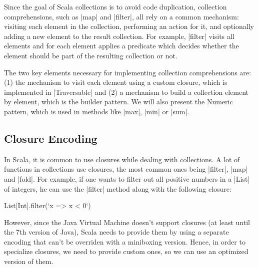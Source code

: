 
Since the goal of Scala collections is to avoid code duplication, collection comprehensions, such as |map| and |filter|, all rely on a common mechanism: visiting each element in the collection, performing an action for it, and optionally adding a new element to the result collection. For example, |filter| visits all elements and for each element applies a predicate which decides whether the element should be part of the resulting collection or not.

The two key elements necessary for implementing collection comprehensions are: (1) the mechanism to visit each element using a custom closure, which is implemented in |Traversable| and (2) a mechanism to build a collection element by element, which is the builder pattern. We will also present the Numeric pattern, which is used in methods like |max|, |min| or |sum|.

\subsection{Closure Encoding}

In Scala, it is common to use closures while dealing with collections. A lot of functions in collections use closures, the most common ones being |filter|, |map| and |fold|. For example, if one wants to filter out all positive numbers in a |List| of integers, he can use the |filter| method along with the following closure:

\begin{lstlisting-nobreak}
 List[Int].filter(`x => x < 0`)
\end{lstlisting-nobreak}

However, since the Java Virtual Machine doesn't support closures (at least until the 7th version of Java), Scala needs to provide them by using a separate encoding that can't be overriden with a miniboxing version. Hence, in order to specialize closures, we need to provide custom ones, so we can use an optimized version of them.

